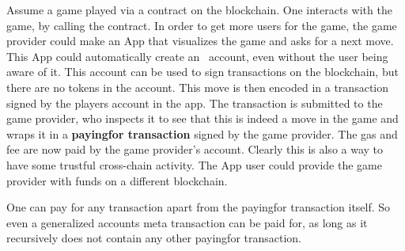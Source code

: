 Assume a game played via a contract on the blockchain. One interacts
with the game, by calling the contract. In order to get more users for
the game, the game provider could make an App that visualizes
the game and asks for a next move. This App could automatically create
an \aet\ account, even without the user being aware of it. This
account can be used to sign transactions on the blockchain, but there
are no tokens in the account. This move is then encoded in a
transaction signed by the players account in the app. The transaction
is submitted to the game provider, who inspects it to see that this
is indeed a move in the game and wraps it in a \textbf{payingfor
  transaction} signed by the game provider. The gas and fee are now
paid by the game provider's account.
Clearly this is also a way to have some trustful cross-chain
activity. The App user could provide the game provider with funds on a
different blockchain.

One can pay for any transaction apart from the payingfor transaction
itself. So even a generalized accounts meta transaction can be paid
for, as long as it recursively does not contain any other payingfor
transaction.

